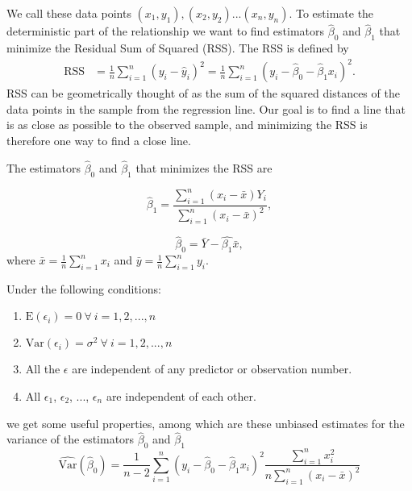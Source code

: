 \documentclass{article}
\begin{document}
We call these data points \((x_1, y_1), (x_2, y_2)
... (x_n, y_n)\). To estimate the deterministic part of the relationship we want
to find estimators \(\hat{\beta}_0\) and \(\hat{\beta}_1\) that minimize the
Residual Sum of Squared (RSS). The RSS is defined by
\begin{align*}
  \mathrm{RSS} &= \frac{1}{n} \sum_{i = 1}^n \left( y_i - \hat{y}_i \right)^2 
  = \frac{1}{n} \sum_{i = 1}^n \left( y_i - \hat{\beta}_0 - \hat{\beta}_1 x_i \right)^2.
\end{align*}
RSS can be geometrically thought of as the sum of the squared distances of
the data points in the sample from the regression line. Our goal is to find a
line that is as close as possible to the observed sample, and minimizing the RSS
is therefore one way to find a close line.

The estimators \(\hat{\beta}_0\) and \(\hat{\beta}_1\) that minimizes the RSS are

\begin{equation*}
 \hat{\beta}_1 = \frac{\sum_{i = 1}^n\left( x_i - \bar{x} \right) Y_i}{\sum_{i = 1}^n\left( x_i - \bar{x} \right)^2} ,
\end{equation*}

\begin{equation*}
 \hat{\beta}_0 = \bar{Y} - \hat{\beta_1}\bar{x},
\end{equation*}
where \(\bar{x} = \frac{1}{n} \sum_{i = 1}^n x_i\) and \(\bar{y} = \frac{1}{n} \sum_{i = 1}^n y_i\).

Under the following conditions:

\begin{enumerate}
\item \(\mathrm{E} \left( \epsilon_i \right) = 0\ \forall \ i = 1, 2, ..., n\)
\item \(\mathrm{Var} \left( \epsilon_i \right) = \sigma^2\ \forall \ i = 1, 2, ..., n\)
\item All the \(\epsilon\) are independent of any predictor or observation number.
\item All \(\epsilon_1\), \(\epsilon_2\), ..., \(\epsilon_n\) are independent of each other.
\end{enumerate}

we get some useful properties, among which are these unbiased estimates for the
variance of the estimators \(\hat{\beta}_0\) and \(\hat{\beta}_1\)
\begin{equation*}
 \widehat{\mathrm{Var}} \left( \hat{\beta}_0 \right) = \frac{1}{n - 2} \sum_{i = 1}^n\left( y_i - \hat{\beta}_0 -
 \hat{\beta}_1 x_i \right)^2 \frac{\sum_{i = 1}^n x_i^2}{n
   \sum_{i = 1}^n \left( x_i - \bar{x} \right)^2}
\end{equation*}
 
\end{document}
